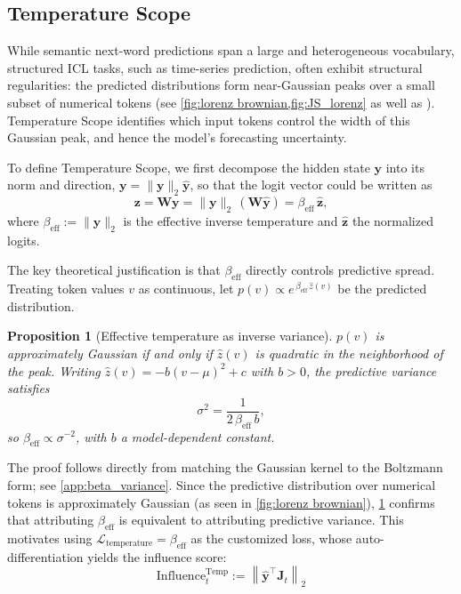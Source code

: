\documentclass{article}
\newtheorem{proposition}{Proposition}
\begin{document}
\subsection{Temperature Scope}
\label{sec:Temperature Scope}

While semantic next-word predictions span a large and heterogeneous vocabulary, 
structured ICL tasks, such as time-series prediction, \cite{gruver2024largelanguagemodelszeroshot} often exhibit structural regularities: 
the predicted distributions form near-Gaussian peaks over a small subset of numerical tokens (see \cref{fig:lorenz brownian,fig:JS_lorenz} as well as \cite{liu2025density}).
Temperature Scope identifies which input tokens control the width of this Gaussian peak, and hence the model's forecasting uncertainty.

To define Temperature Scope, we first decompose the hidden state $\bm{y}$ into its norm and direction, $\bm{y} = \|\bm{y}\|_2 \hat{\bm{y}}$, 
so that the logit vector could be written as 
\[
  \bm{z} = \bm{W}\bm{y} = \|\bm{y}\|_2\,(\bm{W}\hat{\bm{y}}) = \beta_\mathrm{eff}\,\hat{\bm{z}},
\]
where $\beta_\mathrm{eff} := \|\bm{y}\|_2$ is the effective inverse temperature and $\hat{\bm{z}}$ the normalized logits.

The key theoretical justification is that $\beta_\mathrm{eff}$ directly controls predictive spread.
Treating token values $v$ as continuous, let $p(v) \propto e^{\,\beta_\mathrm{eff}\,\hat{z}(v)}$ be the predicted distribution.

\begin{proposition}[Effective temperature as inverse variance]
\label{prop:beta_variance}
$p(v)$ is approximately Gaussian if and only if $\hat{z}(v)$ is quadratic in the neighborhood of the peak.
Writing $\hat{z}(v) = -b(v-\mu)^2 + c$ with $b>0$, the predictive variance satisfies
\begin{equation}
    \sigma^2 = \frac{1}{2\,\beta_\mathrm{eff}\, b},
    \label{eq:beta_variance}
\end{equation}
so $\beta_\mathrm{eff} \propto \sigma^{-2}$, with $b$ a model-dependent constant.
\end{proposition}

The proof follows directly from matching the Gaussian kernel to the Boltzmann form; see \cref{app:beta_variance}.
Since the predictive distribution over numerical tokens is approximately Gaussian (as seen in \cref{fig:lorenz brownian}), \cref{prop:beta_variance} confirms that attributing $\beta_\mathrm{eff}$ is equivalent to attributing predictive variance.
This motivates using $\mathcal{L}_\mathrm{temperature} = \beta_\mathrm{eff}$ as the customized loss, whose auto-differentiation yields the influence score:
\begin{equation}
  \mathrm{Influence}_t^{\mathrm{Temp}} :=\left\| \hat{\bm{y}}^\intercal \bm{J}_t \right\|_2
\end{equation}
\end{document}
